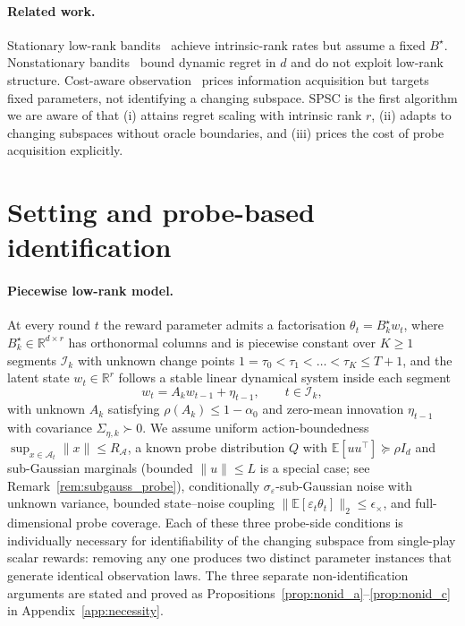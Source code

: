 \documentclass{article}
\newcommand{\R}{\mathbb{R}}
\newcommand{\E}{\mathbb{E}}
\newcommand{\cA}{\mathcal{A}}
\newcommand{\cI}{\mathcal{I}}
\begin{document}
\paragraph{Related work.}
Stationary low-rank
bandits~\citep{jun2019bilinear,kang2022gestt,pmlr-v235-jedra24a,pmlr-v235-jang24e,stojanovic2023spectral}
achieve intrinsic-rank rates but assume a fixed $B^\star$.
Nonstationary
bandits~\citep{russac2019weighted,cheung2019learning,abbasi2023dynamic,hou2024pslb}
bound dynamic regret in $d$ and do not exploit low-rank structure.
Cost-aware
observation~\citep{seldin2014paid,tucker2023costly,elumar2025costly}
prices information acquisition but targets fixed parameters, not
identifying a changing subspace. SPSC is the first algorithm we
are aware of that (i) attains regret scaling with intrinsic
rank $r$, (ii) adapts to changing subspaces without oracle boundaries,
and (iii) prices the cost of probe acquisition explicitly.

\section{Setting and probe-based identification}
\label{sec:setting}

\paragraph{Piecewise low-rank model.}
At every round $t$ the reward parameter admits a factorisation
$\theta_t = B_k^\star w_t$, where $B_k^\star \in \R^{d\times r}$ has
orthonormal columns and is piecewise constant over $K\ge 1$ segments
$\cI_k$ with unknown change points
$1=\tau_0<\tau_1<\dots<\tau_K\le T{+}1$, and the latent state $w_t\in
\R^r$ follows a stable linear dynamical system inside each segment
\[
 w_t = A_k w_{t-1} + \eta_{t-1}, \qquad t \in \cI_k,
\]
with unknown $A_k$ satisfying $\rho(A_k)\le 1{-}\alpha_0$ and zero-mean
innovation $\eta_{t-1}$ with covariance $\Sigma_{\eta,k}\succ 0$. We
assume uniform action-boundedness $\sup_{x\in\cA_t}\|x\|\le R_\cA$,
a known probe distribution $Q$ with $\E[uu^\top]\succeq \rho I_d$ and
sub-Gaussian marginals (bounded $\|u\|\le L$ is a special case; see
Remark~\ref{rem:subgauss_probe}), conditionally
$\sigma_\varepsilon$-sub-Gaussian noise with unknown variance, bounded
state--noise coupling
$\|\E[\varepsilon_t\theta_t]\|_2 \le \epsilon_\times$, and
full-dimensional probe coverage. Each of these three probe-side
conditions is individually necessary for identifiability of the
changing subspace from single-play scalar rewards: removing any one
produces two distinct parameter instances that generate identical
observation laws. The three separate non-identification arguments are
stated and proved as Propositions~\ref{prop:nonid_a}--\ref{prop:nonid_c}
in Appendix~\ref{app:necessity}.
\end{document}
